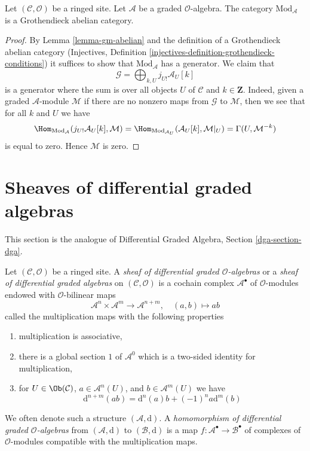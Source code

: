 \begin{lemma}
\label{lemma-gm-grothendieck-abelian}
Let $(\mathcal{C}, \mathcal{O})$ be a ringed site.
Let $\mathcal{A}$ be a graded $\mathcal{O}$-algebra.
The category $\text{Mod}_\mathcal{A}$ is a Grothendieck abelian category.
\end{lemma}

\begin{proof}
By Lemma \ref{lemma-gm-abelian} and the definition of a Grothendieck
abelian category
(Injectives, Definition \ref{injectives-definition-grothendieck-conditions})
it suffices to
show that $\text{Mod}_\mathcal{A}$ has a generator. We claim that
$$
\mathcal{G} = \bigoplus\nolimits_{k, U} j_{U!}\mathcal{A}_U[k]
$$
is a generator where the sum is over all objects $U$ of $\mathcal{C}$
and $k \in \mathbf{Z}$. Indeed, given a graded $\mathcal{A}$-module
$\mathcal{M}$ if there are no nonzero maps from $\mathcal{G}$ to $\mathcal{M}$,
then we see that for all $k$ and $U$ we have
$$
\Hom_{\text{Mod}_\mathcal{A}}(j_{U!}\mathcal{A}_U[k], \mathcal{M}) =
\Hom_{\text{Mod}_{\mathcal{A}_U}}(\mathcal{A}_U[k], \mathcal{M}|_U) =
\Gamma(U, \mathcal{M}^{-k})
$$
is equal to zero. Hence $\mathcal{M}$ is zero.
\end{proof}









\section{Sheaves of differential graded algebras}
\label{section-dga}

\noindent
This section is the analogue of
Differential Graded Algebra, Section \ref{dga-section-dga}.

\begin{definition}
\label{definition-dga}
Let $(\mathcal{C}, \mathcal{O})$ be a ringed site. A
{\it sheaf of differential graded $\mathcal{O}$-algebras}
or a {\it sheaf of differential graded algebras} on
$(\mathcal{C}, \mathcal{O})$ is a cochain complex
$\mathcal{A}^\bullet$ of $\mathcal{O}$-modules
endowed with $\mathcal{O}$-bilinear maps
$$
\mathcal{A}^n \times \mathcal{A}^m \to \mathcal{A}^{n + m},\quad
(a, b) \longmapsto ab
$$
called the multiplication maps with the following properties
\begin{enumerate}
\item multiplication is associative,
\item there is a global section $1$ of $\mathcal{A}^0$
which is a two-sided identity for multiplication,
\item for $U \in \Ob(\mathcal{C})$, $a \in \mathcal{A}^n(U)$, and
$b \in \mathcal{A}^m(U)$ we have
$$
\text{d}^{n + m}(ab) = \text{d}^n(a)b + (-1)^n a\text{d}^m(b)
$$
\end{enumerate}
We often denote such a structure $(\mathcal{A}, \text{d})$.
A {\it homomorphism of differential graded $\mathcal{O}$-algebras}
from $(\mathcal{A}, \text{d})$ to $(\mathcal{B}, \text{d})$ is a map
$f : \mathcal{A}^\bullet \to \mathcal{B}^\bullet$ of complexes
of $\mathcal{O}$-modules compatible with the multiplication maps.
\end{definition}

